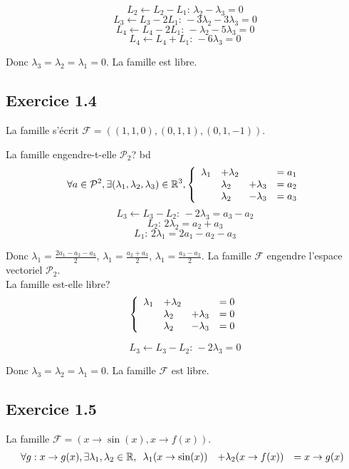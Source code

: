 \documentclass[]{book}
\theoremstyle{definition}
\newcommand{\bb}[1]{\mathbb{#1}}
\newcommand{\R}{\bb{R}}
\begin{document}
$$L_2 \leftarrow L_2-L_1:\, \lambda_2 - \lambda_3 = 0$$
$$L_3 \leftarrow L_3-2L_1:\, -3\lambda_2 - 3\lambda_3 = 0$$
$$L_4 \leftarrow L_4-2L_1:\, -\lambda_2 - 5\lambda_3 = 0$$
$$L_4 \leftarrow L_4+L_1:\, -6\lambda_3 = 0$$

Donc $\lambda_3 = \lambda_2 = \lambda_1 = 0$. La famille est libre.

\subsection*{Exercice 1.4}
La famille s'\'ecrit $\mathcal{F} = ((1,1,0),(0,1,1),(0,1,-1))$.

La famille engendre-t-elle $\mathcal{P}_2$?
bd
$$ \forall a \in \mathcal{P}^2, \exists (\lambda_1,\lambda_2,\lambda_3) \in \R^3,
\left\{ 
\begin{array}{l l l l}
  \lambda_1 & +\lambda_2 &               & = a_1 \\
            & \lambda_2  & +\lambda_3   & = a_2 \\
            & \lambda_2  & -\lambda_3   & = a_3 \\
\end{array}
\right. 
$$
$$L_3 \leftarrow L_3-L_2:\, -2\lambda_3 = a_3-a_2$$
$$L_2:\, 2\lambda_2 = a_2+a_3$$
$$L_1:\, 2\lambda_1 = 2a_1-a_2-a_3$$

Donc $\lambda_1 = \frac{2a_1-a_2-a_3}{2}$, $\lambda_1 = \frac{a_2+a_3}{2}$, $\lambda_1 = \frac{a_3-a_2}{2}$. La famille $\mathcal{F}$ engendre l'espace vectoriel $\mathcal{P}_2$.\\

\medskip
La famille est-elle libre?
$$
\left\{ 
\begin{array}{l l l l}
  \lambda_1 & +\lambda_2 &               & = 0 \\
            & \lambda_2  & +\lambda_3   & = 0 \\
            & \lambda_2  & -\lambda_3   & = 0 \\
\end{array}
\right. 
$$

$$L_3 \leftarrow L_3-L_2:\, -2\lambda_3 = 0$$

Donc $\lambda_3 = \lambda_2 = \lambda_1 = 0$. La famille $\mathcal{F}$ est libre.

\subsection*{Exercice 1.5}
La famille $\mathcal{F} = (x \to \sin(x),x \to f(x))$.
$$
\forall g: x \to g(x), \exists \lambda_1, \lambda_2 \in \R,
\begin{array}{l l l}
  \lambda_1(x \to \sin(x)) & +\lambda_2(x \to f(x)) & = x \to g(x) \\
\end{array}
$$
\end{document}
